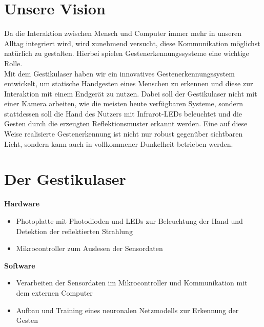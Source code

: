 \documentclass{sciposter}
\begin{document}
\begin{multicols}{3}
\setlength{\parindent}{2em}

\section{Unsere Vision}
\noindent
Da die Interaktion zwischen Mensch und Computer immer mehr in unseren Alltag integriert wird, wird zunehmend versucht, diese Kommunikation möglichst natürlich zu gestalten. Hierbei spielen Gestenerkennungssysteme eine wichtige Rolle. \\
Mit dem Gestikulaser haben wir ein innovatives Gestenerkennungssystem entwickelt, um statische Handgesten eines Menschen zu erkennen und diese zur Interaktion mit einem Endgerät zu nutzen. Dabei soll der Gestikulaser nicht mit einer Kamera arbeiten, wie die meisten heute verfügbaren Systeme, sondern stattdessen soll die Hand des Nutzers mit Infrarot-LEDs beleuchtet und die Gesten durch die erzeugten Reflektionsmuster erkannt werden. Eine auf diese Weise realisierte Gestenerkennung ist nicht nur robust gegenüber sichtbaren Licht, sondern kann auch in vollkommener Dunkelheit betrieben werden. \\


\section{Der Gestikulaser}
\noindent
\textbf{Hardware}
\begin{itemize}
	\item Photoplatte mit Photodioden und LEDs zur Beleuchtung der Hand und Detektion der reflektierten Strahlung
	\item Mikrocontroller zum Auslesen der Sensordaten
\end{itemize}

\noindent
\textbf{Software}
\begin{itemize}
	\item Verarbeiten der Sensordaten im Mikrocontroller und Kommunikation mit dem externen Computer
	\item Aufbau und Training eines neuronalen Netzmodells zur Erkennung der Gesten
\end{itemize}


\end{multicols}
\end{document}
